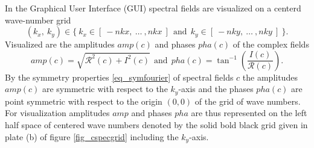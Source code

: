 In the Graphical User Interface (GUI) spectral fields are visualized on
a centerd wave-number grid
\begin{equation} \label{eq_centwgrid}
   (k_{x},\ k_{y}) \in  
   \{\ k_{x} \in [\ -nkx, \ \dots \ ,nkx \ ] 
    \ \ \mbox{and} \ \ 
       k_{y} \in [\ -nky, \ \dots \ ,nky \ ] \ \}.
\end{equation}
Visualized are the amplitudes $amp(c)$ and phases $pha(c)$ of the
complex fields
\begin{equation} \label{eq_amppha}
   amp(c) = \sqrt{\mathcal{R}^{2}(c) + I^{2}(c)}
   \ \ \mbox{and} \ \ 
   pha(c) = \tan^{-1}(\frac{I(c)}{\mathcal{R}(c)}).
\end{equation}
By the symmetry properties \ref{eq_symfourier} of spectral fields $c$ 
the amplitudes $amp(c)$ are symmetric with respect to the $k_{y}$-axis 
and the phases $pha(c)$ are point symmetric with respect to the origin
$(0,0)$ of the grid of wave numbers. For visualization amplitudes $amp$ 
and phases $pha$ are thus represented on the left half space of centered
wave numbers denoted by the solid bold black grid given in plate (b) 
of figure \ref{fig_cspecgrid} including the $k_{y}$-axis.
